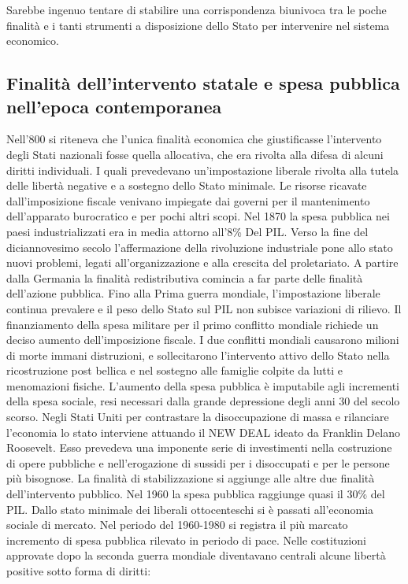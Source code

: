 \documentclass{report}
\begin{document}
Sarebbe ingenuo tentare di stabilire una corrispondenza biunivoca tra le poche finalità e i tanti strumenti a disposizione dello Stato per intervenire nel sistema economico.

\subsection{Finalità dell'intervento statale e spesa pubblica nell'epoca contemporanea}

Nell’800 si riteneva che l’unica finalità economica che giustificasse l'intervento degli Stati nazionali fosse quella allocativa, che era rivolta alla difesa di alcuni diritti individuali. I quali prevedevano un'impostazione liberale rivolta alla tutela delle libertà negative e a sostegno dello Stato minimale. Le risorse ricavate dall'imposizione fiscale venivano impiegate dai governi per il mantenimento dell'apparato burocratico e per pochi altri scopi.
Nel 1870 la spesa pubblica nei paesi industrializzati era in media attorno all'8\% Del PIL.
Verso la fine del diciannovesimo secolo l'affermazione della rivoluzione industriale pone allo stato nuovi problemi, legati all'organizzazione e alla crescita del proletariato. 
A partire dalla Germania la finalità redistributiva comincia a far parte delle finalità dell'azione pubblica.
Fino alla Prima guerra mondiale, l'impostazione liberale continua prevalere e il peso dello Stato sul PIL non subisce variazioni di rilievo.
Il finanziamento della spesa militare per il primo conflitto mondiale richiede un deciso aumento dell'imposizione fiscale.
I due conflitti mondiali causarono milioni di morte immani distruzioni, e sollecitarono l'intervento attivo dello Stato nella ricostruzione post bellica e nel sostegno alle famiglie colpite da lutti e menomazioni fisiche.
L'aumento della spesa pubblica è imputabile agli incrementi della spesa sociale, resi necessari dalla grande depressione degli anni 30 del secolo scorso.
Negli Stati Uniti per contrastare la disoccupazione di massa e rilanciare l'economia lo stato interviene attuando il NEW DEAL ideato da Franklin Delano Roosevelt. Esso prevedeva una imponente serie di investimenti nella costruzione di opere pubbliche e nell'erogazione di sussidi per i disoccupati e per le persone più bisognose. La finalità di stabilizzazione si aggiunge alle altre due finalità dell'intervento pubblico.
Nel 1960 la spesa pubblica raggiunge quasi il 30\% del PIL.
Dallo stato minimale dei liberali ottocenteschi si è passati all'economia sociale di mercato.
Nel periodo del 1960-1980 si registra il più marcato incremento di spesa pubblica rilevato in periodo di pace.
Nelle costituzioni approvate dopo la seconda guerra mondiale diventavano centrali alcune libertà positive sotto forma di diritti:
\end{document}

